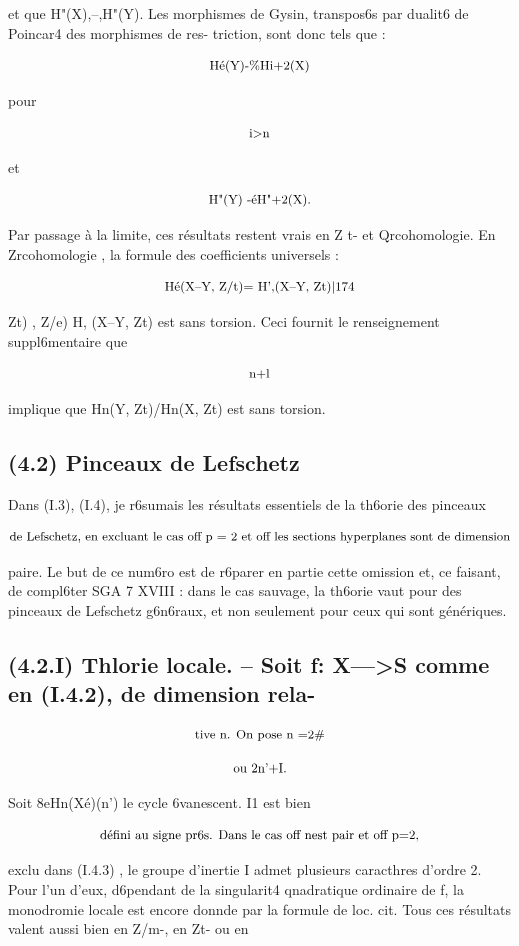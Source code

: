 \documentclass[11pt]{article}
\theoremstyle{remark}
\begin{document}
et que H"(X),--,H"(Y). Les morphismes de Gysin, transpos6s par dualit6 de Poincar4 des morphismes de res- triction, sont donc tels que :

\[\text{\small Hé(Y)-\%Hi+2(X)}\]

pour

\[\text{\small i>n}\]

et

\[\text{\small H"(Y) -éH"+2(X).}\]

Par passage à la limite, ces résultats restent vrais en Z t- et Qrcohomologie. En Zrcohomologie , la formule des coefficients universels :

\[\text{\small Hé(X--Y, Z/t)= H',(X--Y, Zt)|174}\]

Zt) , Z/e) H, (X--Y, Zt) est sans torsion. Ceci fournit le renseignement suppl6mentaire que

\[\text{\small n+l}\]

implique que Hn(Y, Zt)/Hn(X, Zt) est sans torsion.

\subsection*{(4.2) Pinceaux de Lefschetz}

Dans (I.3), (I.4), je r6sumais les résultats essentiels de la th6orie des pinceaux

\[\text{\small de Lefschetz, en excluant le cas off p = 2 et off les sections hyperplanes sont de dimension}\]

paire. Le but de ce num6ro est de r6parer en partie cette omission et, ce faisant, de compl6ter SGA 7 XVIII : dans le cas sauvage, la th6orie vaut pour des pinceaux de Lefschetz g6n6raux, et non seulement pour ceux qui sont génériques.

\subsection*{(4.2.I) Thlorie locale. -- Soit f: X--->S comme en (I.4.2), de dimension rela-}

\[\text{\small tive n. On pose n =2\#}\]

\[\text{\small ou 2n'+I.}\]

Soit 8eHn(Xé)(n') le cycle 6vanescent. I1 est bien

\[\text{\small défini au signe pr6s. Dans le cas off nest pair et off p=2,}\]

exclu dans (I.4.3) , le groupe d'inertie I admet plusieurs caracthres d'ordre 2. Pour l'un d'eux, d6pendant de la singularit4 qnadratique ordinaire de f, la monodromie locale est encore donnde par la formule de loc. cit. Tous ces résultats valent aussi bien en Z/m-, en Zt- ou en
\end{document}
